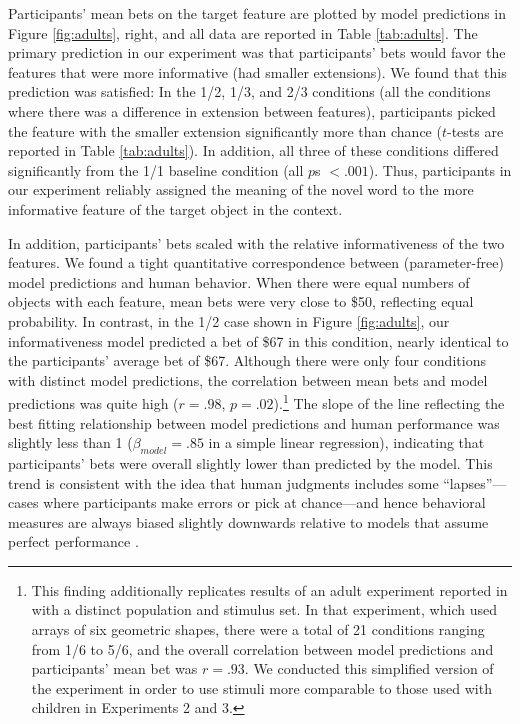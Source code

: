 \documentclass[man,noapacite]{apa2}
\begin{document}
Participants' mean bets on the target feature are plotted by model predictions in Figure \ref{fig:adults}, right, and all data are reported in Table \ref{tab:adults}. The primary prediction in our experiment was that participants' bets would favor the features that were more informative (had smaller extensions). We found that this prediction was satisfied: In the 1/2, 1/3, and 2/3 conditions (all the conditions where there was a difference in extension between features), participants picked the feature with the smaller extension significantly more than chance ($t$-tests are reported in Table \ref{tab:adults}). In addition, all three of these conditions differed significantly from the 1/1 baseline condition (all $p$s $< .001$). Thus, participants in our experiment reliably assigned the meaning of the novel word to the more informative feature of the target object in the context. 

In addition, participants' bets scaled with the relative informativeness of the two features. We found a tight quantitative correspondence between (parameter-free) model predictions and human behavior. When there were equal numbers of objects with each feature, mean bets were very close to \$50, reflecting equal probability. In contrast, in the 1/2 case shown in Figure \ref{fig:adults}, our informativeness model predicted a bet of \$67 in this condition, nearly identical to the participants' average bet of \$67. Although there were only four conditions with distinct model predictions, the correlation between mean bets and model predictions was quite high ($r = .98$, $p = .02$).\footnote{This finding additionally replicates results of an adult experiment reported in  with a distinct population and stimulus set. In that experiment, which used arrays of six geometric shapes, there were a total of 21 conditions ranging from 1/6 to 5/6, and the overall correlation between model predictions and participants' mean bet was $r=.93$. We conducted this simplified version of the experiment in order to use stimuli more comparable to those used with children in Experiments 2 and 3.} The slope of the line reflecting the best fitting relationship between model predictions and human performance was slightly less than 1 ($\beta_{model} = .85$ in a simple linear regression), indicating that participants' bets were overall slightly lower than predicted by the model. This trend is consistent with the idea that human judgments includes some ``lapses''---cases where participants make errors or pick at chance---and hence behavioral measures are always biased slightly downwards relative to models that assume perfect performance \cite{wichmann2001,frank2010}. 
\end{document}
